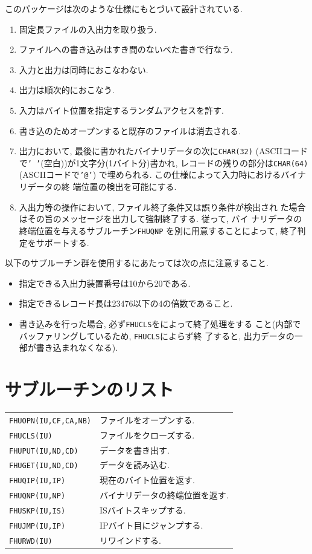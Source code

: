 \vspace{1em}
このパッケージは次のような仕様にもとづいて設計されている. 
\begin{enumerate}
  \item 固定長ファイルの入出力を取り扱う.
  \item ファイルへの書き込みはすき間のないべた書きで行なう.
  \item 入力と出力は同時におこなわない.
  \item 出力は順次的におこなう.
  \item 入力はバイト位置を指定するランダムアクセスを許す.
  \item 書き込のためオープンすると既存のファイルは消去される.
  \item 出力において, 最後に書かれたバイナリデータの次に{\tt CHAR(32)}
        (ASCIIコードで{\tt ' '}(空白))が1文字分(1バイト分)書かれ, 
        レコードの残りの部分は{\tt CHAR(64)}(ASCIIコードで{\tt '@'})
        で埋められる. この仕様によって入力時におけるバイナリデータの終
        端位置の検出を可能にする.
  \item 入出力等の操作において, ファイル終了条件又は誤り条件が検出され
        た場合はその旨のメッセージを出力して強制終了する. 従って, バイ
        ナリデータの終端位置を与えるサブルーチン{\tt FHUQNP}
        を別に用意することによって, 終了判定をサポートする.
\end{enumerate}

\vspace{1em}
以下のサブルーチン群を使用するにあたっては次の点に注意すること. 
\begin{itemize}
  \item 指定できる入出力装置番号は10から20である.
  \item 指定できるレコード長は23476以下の4の倍数であること.
  \item 書き込みを行った場合, 必ず{\tt FHUCLS}をによって終了処理をする
        こと(内部でバッファリングしているため, {\tt FHUCLS}によらず終
        了すると, 出力データの一部が書き込まれなくなる).
\end{itemize}

\section{サブルーチンのリスト}
\begin{tabular}{lp{10cm}}
  {\tt FHUOPN(IU,CF,CA,NB)} & ファイルをオープンする. \\
  {\tt FHUCLS(IU)}          & ファイルをクローズする. \\
  {\tt FHUPUT(IU,ND,CD)}    & データを書き出す. \\
  {\tt FHUGET(IU,ND,CD)}    & データを読み込む. \\
  {\tt FHUQIP(IU,IP)}       & 現在のバイト位置を返す. \\
  {\tt FHUQNP(IU,NP)}       & バイナリデータの終端位置を返す. \\
  {\tt FHUSKP(IU,IS)}       & ISバイトスキップする. \\
  {\tt FHUJMP(IU,IP)}       & IPバイト目にジャンプする. \\
  {\tt FHURWD(IU)}          & リワインドする. 
\end{tabular}

